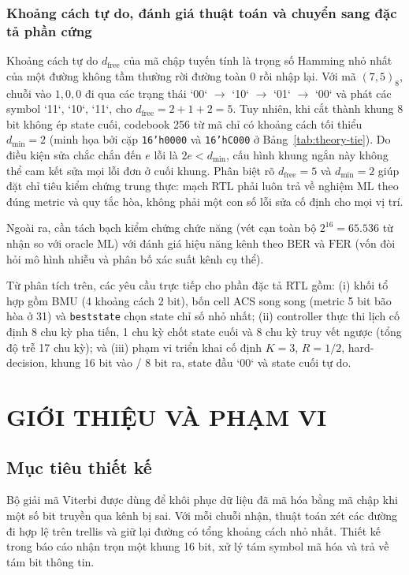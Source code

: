 \documentclass[12pt,a4paper]{article}
\DeclareRobustCommand{\code}[1]{\texttt{#1}}
\renewcommand{\_}{\originalunderscore\allowbreak}
\begin{document}
\subsubsection{Khoảng cách tự do, đánh giá thuật toán và chuyển sang đặc tả phần cứng}
Khoảng cách tự do $d_{\mathrm{free}}$ của mã chập tuyến tính là trọng số Hamming nhỏ nhất của một đường không tầm thường rời đường toàn 0 rồi nhập lại. Với mã $(7,5)_8$, chuỗi vào $1,0,0$ đi qua các trạng thái `00` $\rightarrow$ `10` $\rightarrow$ `01` $\rightarrow$ `00` và phát các symbol `11`, `10`, `11`, cho $d_{\mathrm{free}}=2+1+2=5$. Tuy nhiên, khi cắt thành khung 8 bit không ép state cuối, codebook 256 từ mã chỉ có khoảng cách tối thiểu $d_{\min}=2$ (minh họa bởi cặp \code{16'h0000} và \code{16'hC000} ở Bảng~\ref{tab:theory-tie}). Do điều kiện sửa chắc chắn đến $e$ lỗi là $2e<d_{\min}$, cấu hình khung ngắn này không thể cam kết sửa mọi lỗi đơn ở cuối khung. Phân biệt rõ $d_{\mathrm{free}}=5$ và $d_{\min}=2$ giúp đặt chỉ tiêu kiểm chứng trung thực: mạch RTL phải luôn trả về nghiệm ML theo đúng metric và quy tắc hòa, không phải một con số lỗi sửa cố định cho mọi vị trí.

Ngoài ra, cần tách bạch kiểm chứng chức năng (vét cạn toàn bộ $2^{16}=65.536$ từ nhận so với oracle ML) với đánh giá hiệu năng kênh theo $\mathrm{BER}$ và $\mathrm{FER}$ (vốn đòi hỏi mô hình nhiễu và phân bố xác suất kênh cụ thể).

Từ phân tích trên, các yêu cầu trực tiếp cho phần đặc tả RTL gồm: (i) khối tổ hợp gồm BMU (4 khoảng cách 2 bit), bốn cell ACS song song (metric 5 bit bão hòa ở 31) và \code{best\_state} chọn state chỉ số nhỏ nhất; (ii) controller thực thi lịch cố định 8 chu kỳ pha tiến, 1 chu kỳ chốt state cuối và 8 chu kỳ truy vết ngược (tổng độ trễ 17 chu kỳ); và (iii) phạm vi triển khai cố định $K=3$, $R=1/2$, hard-decision, khung 16 bit vào / 8 bit ra, state đầu `00` và state cuối tự do.
\clearpage


\clearpage
\section{GIỚI THIỆU VÀ PHẠM VI}
\subsection{Mục tiêu thiết kế}
Bộ giải mã Viterbi được dùng để khôi phục dữ liệu đã mã hóa bằng mã chập khi một số bit truyền qua kênh bị sai. Với mỗi chuỗi nhận, thuật toán xét các đường đi hợp lệ trên trellis và giữ lại đường có tổng khoảng cách nhỏ nhất. Thiết kế trong báo cáo nhận trọn một khung 16 bit, xử lý tám symbol mã hóa và trả về tám bit thông tin.
\end{document}
